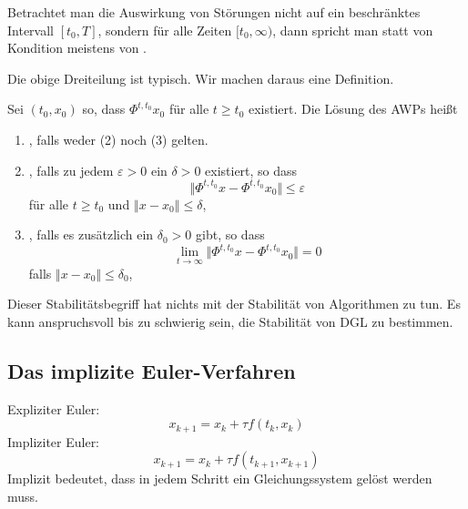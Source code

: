 Betrachtet man die Auswirkung von Störungen nicht auf ein beschränktes Intervall $[t_0,T]$, sondern für alle Zeiten $[t_0,\infty)$, dann spricht man statt von Kondition meistens von .

Die obige Dreiteilung ist typisch. Wir machen daraus eine Definition.

\begin{defi}
	Sei $\left(t_0,x_0 \right)$ so, dass $\Phi^{t,t_0} x_0$ für alle $t \geq t_0$ existiert. Die Lösung des AWPs heißt
	\begin{enumerate}[label=(\arabic*)]
		\item {}, falls weder (2) noch (3) gelten.
		\item {}, falls zu jedem $\varepsilon >0$ ein $\delta >0$ existiert, so dass
		\begin{equation*}
			\big\Vert \Phi^{t,t_0} x -\Phi^{t,t_0} x_0 \big\Vert \leq \varepsilon
		\end{equation*}
		für alle $t \geq t_0$ und $\left\Vert x-x_0 \right\Vert \leq \delta$,
		\item {}, falls es zusätzlich ein $\delta_0>0$ gibt, so dass
		\begin{equation*}
			\lim_{t \to \infty} \big\Vert \Phi^{t,t_0} x -\Phi^{t,t_0} x_0 \big\Vert =0
		\end{equation*}
		falls $\Vert x-x_0 \Vert \leq \delta_0$,
	\end{enumerate}
\end{defi}

\begin{bem}
	Dieser Stabilitätsbegriff hat nichts mit der Stabilität von Algorithmen zu tun.
	Es kann anspruchsvoll bis zu schwierig sein, die Stabilität von DGL zu bestimmen.
\end{bem}


\subsection{Das implizite Euler-Verfahren}

Expliziter Euler: 
\begin{equation*}
	x_{k+1}=x_k+\tau f \left(t_k,x_k \right)
\end{equation*}
Impliziter Euler: 
\begin{equation*}
	x_{k+1}=x_k+\tau f \left(t_{k+1},x_{k+1} \right)
\end{equation*}
Implizit bedeutet, dass in jedem Schritt ein Gleichungssystem gelöst werden muss.

